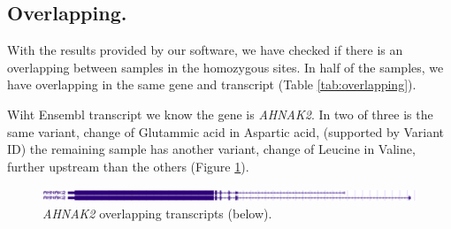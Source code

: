 \documentclass[
tikz,
11pt, %
oneside, %
english, %
singlespacing, %
headsepline, %
]{MastersDoctoralThesisV2} %
\begin{document}

\subsection{Overlapping.}
With the results provided by our software, we have checked if there is an overlapping between samples in the homozygous sites.
In half of the samples, we have overlapping in the same gene and transcript (Table \ref{tab:overlapping}).

Wiht Ensembl transcript we know the gene is \emph{AHNAK2}.
In two of three is the same variant, change of Glutammic acid in Aspartic acid, (supported by Variant ID) the remaining sample has another variant, change of Leucine in Valine, further upstream than the others (Figure \ref{fig:gene_ahnak2}). 

\begin{figure}[th]
\centering
\includegraphics[width=1\textwidth]{fig/gene_ahnak2.png}
\decoRule
\caption[Gene]{\emph{AHNAK2} overlapping transcripts (below).}
\label{fig:gene_ahnak2}
\end{figure}
\end{document}
